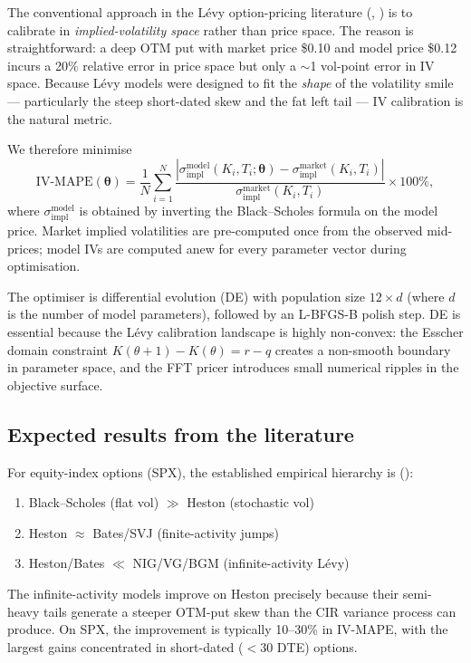 \documentclass[12pt, a4paper]{article}
\begin{document}
The conventional approach in the Lévy option-pricing literature
(, ) is to calibrate in
\emph{implied-volatility space} rather than price space.  The reason is
straightforward: a deep OTM put with market price \$0.10 and model price
\$0.12 incurs a 20\% relative error in price space but only a $\sim$1
vol-point error in IV space.  Because Lévy models were designed to fit the
\emph{shape} of the volatility smile --- particularly the steep short-dated
skew and the fat left tail --- IV calibration is the natural metric.

We therefore minimise
\begin{equation}
  \text{IV-MAPE}(\boldsymbol\theta)
  = \frac{1}{N}\sum_{i=1}^{N}
    \frac{|\sigma^{\text{model}}_{\text{impl}}(K_i,T_i;\boldsymbol\theta)
          -\sigma^{\text{market}}_{\text{impl}}(K_i,T_i)|}
         {\sigma^{\text{market}}_{\text{impl}}(K_i,T_i)}\times 100\% ,
\end{equation}
where $\sigma^{\text{model}}_{\text{impl}}$ is obtained by inverting the
Black--Scholes formula on the model price.  Market implied volatilities
are pre-computed once from the observed mid-prices; model IVs are computed
anew for every parameter vector during optimisation.

The optimiser is differential evolution (DE) with population size
$12\times d$ (where $d$ is the number of model parameters), followed by an
L-BFGS-B polish step.  DE is essential because the Lévy calibration
landscape is highly non-convex: the Esscher domain constraint
$K(\theta+1)-K(\theta)=r-q$ creates a non-smooth boundary in parameter
space, and the FFT pricer introduces small numerical ripples in the
objective surface.

\subsection{Expected results from the literature}

For equity-index options (SPX), the established empirical hierarchy is
():
\begin{enumerate}
  \item Black--Scholes (flat vol) $\gg$ Heston (stochastic vol)
  \item Heston $\approx$ Bates/SVJ (finite-activity jumps)
  \item Heston/Bates $\ll$ NIG/VG/BGM (infinite-activity Lévy)
\end{enumerate}
The infinite-activity models improve on Heston precisely because their
semi-heavy tails generate a steeper OTM-put skew than the CIR variance
process can produce.  On SPX, the improvement is typically 10--30\% in
IV-MAPE, with the largest gains concentrated in short-dated ($<30$ DTE)
options.
\end{document}
